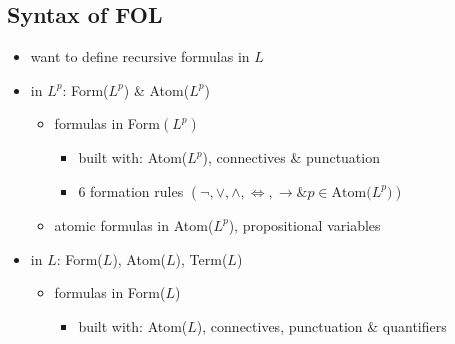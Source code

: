 \documentclass[11pt]{article}
\begin{document}
\subsection{Syntax of FOL}
\begin{itemize}
    \item want to define recursive formulas in $L$
    \item in $L^p$: Form($L^p$) \& Atom($L^p$)
    \begin{itemize}
        \item formulas in Form$(L^p)$
        \begin{itemize}
            \item built with: Atom($L^p$), connectives \& punctuation 
            \item 6 formation rules $(\neg,\lor,\land,\iff,\rightarrow\& p\in\text{Atom($L^p$)})$
        \end{itemize}
        \item atomic formulas in Atom($L^p$), propositional variables 
    \end{itemize}
    \item in $L$: Form($L$), Atom($L$), Term($L$)
    \begin{itemize}
        \item formulas in Form($L$)
        \begin{itemize}
            \item built with: Atom($L$), connectives, punctuation \& quantifiers 
        \end{itemize}
    \end{itemize}
\end{itemize}
\end{document}
